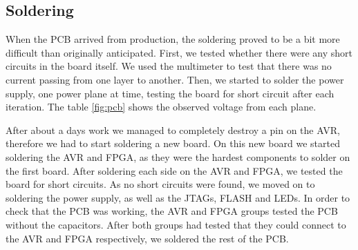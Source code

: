 \subsection{Soldering}


When the \ac{PCB} arrived from production, the soldering proved
to be a bit more difficult than originally anticipated.
First, we tested whether
there were any short circuits in the board itself. We used the multimeter to test that
there was no current passing from one layer to another. Then, we started to solder the power supply, one power plane at time, testing the board for short
circuit after each iteration. The table \ref{fig:pcb} shows the observed voltage from each plane.





After about a days work we managed to completely destroy a pin on the AVR,
therefore we had to start soldering a new board. On this new board we
started soldering the AVR and \ac{FPGA}, as they were the hardest components to
solder on the first board. After soldering each side on the AVR and \ac{FPGA}, 
we tested the board for short circuits. As no short circuits were found, 
we moved on to soldering the power supply, as well as the \acp{JTAG}, FLASH 
and \acp{LED}. In order to check that the \ac{PCB} was working, the
AVR and \ac{FPGA} groups tested the \ac{PCB} without the capacitors. 
After both groups had tested that they could connect to the AVR and \ac{FPGA}
respectively, we soldered the rest of the \ac{PCB}.
